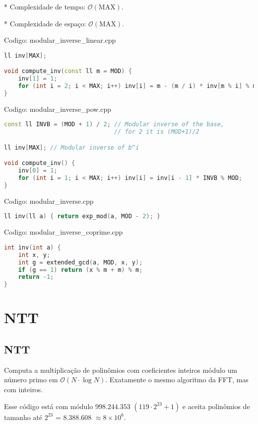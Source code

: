 \documentclass[10pt, a4paper, oneside]{book}
\begin{document}
* Complexidade de tempo: $\mathcal{O}(\text{MAX})$.

* Complexidade de espaço: $\mathcal{O}(\text{MAX})$.
\hfill

Codigo: modular\_inverse\_linear.cpp

\begin{lstlisting}[language=C++]
ll inv[MAX];

void compute_inv(const ll m = MOD) {
    inv[1] = 1;
    for (int i = 2; i < MAX; i++) inv[i] = m - (m / i) * inv[m % i] % m;
}
\end{lstlisting}
\hfill

Codigo: modular\_inverse\_pow.cpp

\begin{lstlisting}[language=C++]
const ll INVB = (MOD + 1) / 2; // Modular inverse of the base,
                               // for 2 it is (MOD+1)/2

ll inv[MAX]; // Modular inverse of b^i

void compute_inv() {
    inv[0] = 1;
    for (int i = 1; i < MAX; i++) inv[i] = inv[i - 1] * INVB % MOD;
}
\end{lstlisting}
\hfill

Codigo: modular\_inverse.cpp

\begin{lstlisting}[language=C++]
ll inv(ll a) { return exp_mod(a, MOD - 2); }
\end{lstlisting}
\hfill

Codigo: modular\_inverse\_coprime.cpp

\begin{lstlisting}[language=C++]
int inv(int a) {
    int x, y;
    int g = extended_gcd(a, MOD, x, y);
    if (g == 1) return (x % m + m) % m;
    return -1;
}
\end{lstlisting}
\hfill

\section{NTT}
\subsection{NTT}


Computa a multiplicação de polinômios com coeficientes inteiros módulo um número primo em $\mathcal{O}(N \cdot \log N)$. Exatamente o mesmo algoritmo da FFT, mas com inteiros.



Esse código está com módulo $998.244.353$ $(119 \cdot 2^{23} + 1)$ e aceita polinômios de tamanho até $2^{23}$ = $8.388.608$ $\approx 8 \times 10^6$.
\end{document}
